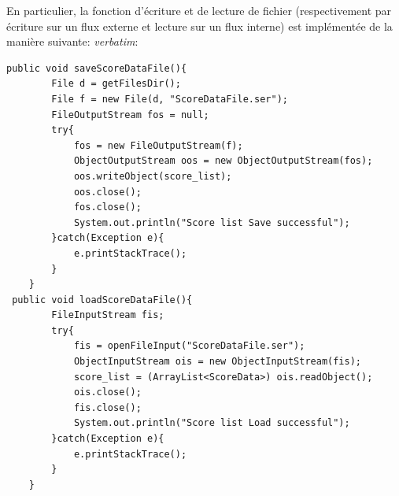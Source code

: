 \documentclass{article}
\begin{document}
En particulier, la fonction d'écriture et de lecture de fichier (respectivement  par écriture sur un flux externe et lecture sur un flux interne) est implémentée de la manière suivante:
\textit{verbatim}:
\begin{verbatim}
public void saveScoreDataFile(){
        File d = getFilesDir();
        File f = new File(d, "ScoreDataFile.ser");
        FileOutputStream fos = null;
        try{
            fos = new FileOutputStream(f);
            ObjectOutputStream oos = new ObjectOutputStream(fos);
            oos.writeObject(score_list);
            oos.close();
            fos.close();
            System.out.println("Score list Save successful");
        }catch(Exception e){
            e.printStackTrace();
        }
    }
 public void loadScoreDataFile(){
        FileInputStream fis;
        try{
            fis = openFileInput("ScoreDataFile.ser");
            ObjectInputStream ois = new ObjectInputStream(fis);
            score_list = (ArrayList<ScoreData>) ois.readObject();
            ois.close();
            fis.close();
            System.out.println("Score list Load successful");
        }catch(Exception e){
            e.printStackTrace();
        }
    }
\end{verbatim}
\end{document}
